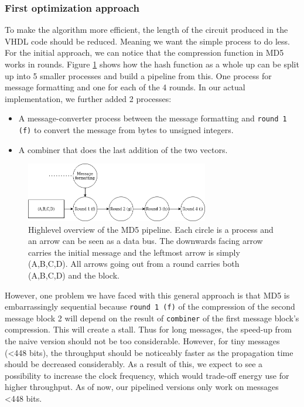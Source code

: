 \documentclass[a4paper]{article}
\begin{document}
\subsubsection{First optimization approach}
\label{sec:org2cd8fce}
To make the algorithm more efficient, the length of the circuit produced in the VHDL code should be reduced. Meaning we want the simple process to do less. For the initial approach, we can notice that the compression function in MD5 works in rounds. Figure \ref{fig:MD5opt1} shows how the hash function as a whole up can be split up into 5 smaller processes and build a pipeline from this. One process for message formatting and one for each of the 4 rounds. In our actual implementation, we further added 2 processes:
\begin{itemize}
\item A message-converter process between the message formatting and \texttt{round 1 (f)} to convert the message from bytes to unsigned integers.
\item A combiner that does the last addition of the two vectors.
\end{itemize}

\begin{figure}[H]
\centering
\includegraphics[width=8cm]{md5.png}
\caption[Pipeline MD5]{Highlevel overview of the MD5 pipeline. Each circle is a process and an arrow can be seen as a data bus. The downwards facing arrow carries the initial message and the leftmost arrow is simply (A,B,C,D). All arrows going out from a round carries both (A,B,C,D) and the block.}
\label{fig:MD5opt1}
\end{figure}

However, one problem we have faced with this general approach is that MD5 is embarrassingly sequential because \texttt{round 1 (f)} of the compression of the second message block 2 will depend on the result of \texttt{combiner} of the first message block's compression. This will create a stall. Thus for long messages, the speed-up from the naive version should not be too considerable. However, for tiny messages (<448 bits), the throughput should be noticeably faster as the propagation time should be decreased considerably. As a result of this, we expect to see a possibility to increase the clock frequency, which would trade-off energy use for higher throughput.
As of now, our pipelined versions only work on messages <448 bits.
\end{document}
